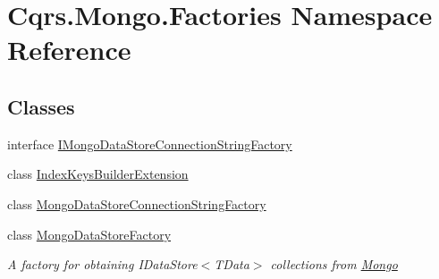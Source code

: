 \hypertarget{namespaceCqrs_1_1Mongo_1_1Factories}{}\section{Cqrs.\+Mongo.\+Factories Namespace Reference}
\label{namespaceCqrs_1_1Mongo_1_1Factories}
\subsection*{Classes}
\begin{DoxyCompactItemize}
\item 
interface \hyperlink{interfaceCqrs_1_1Mongo_1_1Factories_1_1IMongoDataStoreConnectionStringFactory}{I\+Mongo\+Data\+Store\+Connection\+String\+Factory}
\item 
class \hyperlink{classCqrs_1_1Mongo_1_1Factories_1_1IndexKeysBuilderExtension}{Index\+Keys\+Builder\+Extension}
\item 
class \hyperlink{classCqrs_1_1Mongo_1_1Factories_1_1MongoDataStoreConnectionStringFactory}{Mongo\+Data\+Store\+Connection\+String\+Factory}
\item 
class \hyperlink{classCqrs_1_1Mongo_1_1Factories_1_1MongoDataStoreFactory}{Mongo\+Data\+Store\+Factory}
\begin{DoxyCompactList}\small\item\em A factory for obtaining I\+Data\+Store$<$\+T\+Data$>$ collections from \hyperlink{namespaceCqrs_1_1Mongo}{Mongo} \end{DoxyCompactList}\end{DoxyCompactItemize}
